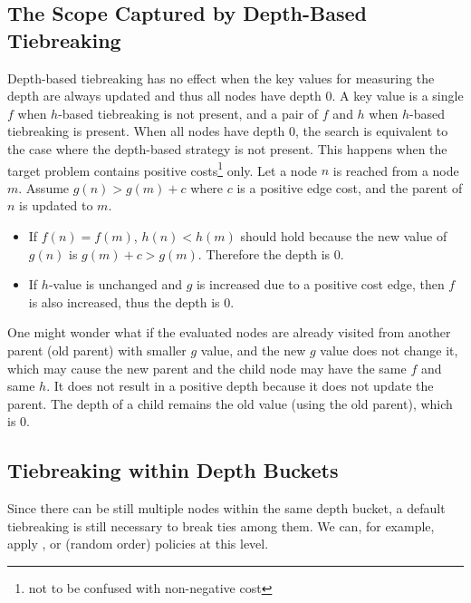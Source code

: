 
\subsection{The Scope Captured by Depth-Based Tiebreaking}

Depth-based tiebreaking has no effect when the key values for measuring
the depth are always updated and thus all nodes have depth 0. A key
value is a single $f$ when $h$-based tiebreaking is not present, and a
pair of $f$ and $h$ when $h$-based tiebreaking is present. When all
nodes have depth 0, the search is equivalent to the case where 
the depth-based strategy is not present.
% 
This happens when the target problem contains
positive costs\footnote{not to be confused with non-negative cost} only.
Let a node $n$ is reached from a node $m$. Assume
 $g(n)>g(m)+c$ where $c$ is a positive edge cost, and the parent of $n$
 is updated to $m$.

\begin{itemize}
 \item 
       If $f(n)=f(m)$, $h(n)<h(m)$ should hold because the new value of
       $g(n)$ is $g(m)+c>g(m)$. Therefore the depth is 0.
 \item If $h$-value is unchanged and $g$ is increased due to a positive
       cost edge, then $f$ is also increased, thus the depth is 0.
\end{itemize}

One might wonder what if the evaluated nodes are already visited from
another parent (old parent) with smaller $g$ value, and the new $g$ value does not change it,
which may cause the new parent and the child node may have the same $f$ and
same $h$. It does not result in a positive depth because it does not update the parent. The depth of a
child remains the old value (using the old parent), which is 0.


\subsection{Tiebreaking within Depth Buckets}

Since there can be still multiple nodes within the same depth bucket, a
default tiebreaking is still necessary to break ties among them.
We can, for example, apply \lifo, \fifo or \ro (random order) policies
at this level.

